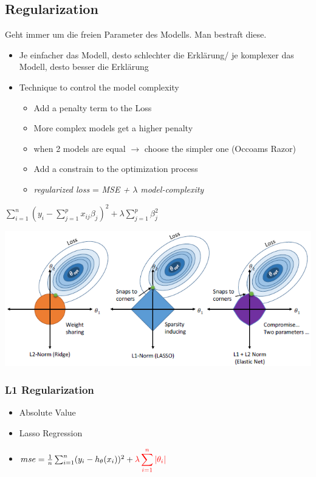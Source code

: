 \subsection{Regularization}
Geht immer um die freien Parameter des Modells. Man bestraft diese. 
\begin{itemize}
    \item Je einfacher das Modell, desto schlechter die Erklärung/ je komplexer das Modell, desto besser die Erklärung
    \item Technique to control the model complexity
    \begin{itemize}
        \item Add a penalty term to the Loss
        \item More complex models get a higher penalty
        \item when 2 models are equal $\rightarrow$ choose the simpler one (Occoams Razor)
        \item Add a constrain to the optimization process
        \item \textit{regularized loss} = \textit{MSE + $\lambda$ model-complexity}
    \end{itemize}
\end{itemize}
\begin{center}
    $\displaystyle\sum_{i = 1}^{n} (y_i - \displaystyle\sum_{j = 1}^{p} x_{ij}\beta_j)^2 + \lambda \displaystyle\sum_{j = 1}^{p}\beta_j^2$
\end{center}
\includegraphics[width=1\linewidth]{./img/regularization.png}

\subsubsection{L1 Regularization}
\begin{itemize}
    \item Absolute Value
    \item Lasso Regression
    \item $mse = \frac{1}{n}\sum_{i=1}^{n} (y_i - h_{\theta}(x_i))^2+\textcolor{red}{\lambda \displaystyle\sum_{i=1}^n|\theta_i|}$
\end{itemize}

